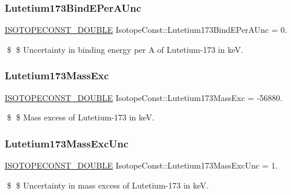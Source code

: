 \subsubsection{\texorpdfstring{Lutetium173\+Bind\+E\+Per\+A\+Unc}{Lutetium173BindEPerAUnc}}
{\footnotesize\ttfamily \mbox{\hyperlink{group___isotope_const-_macros_ga8f45a7272ce02c0b4c65c44636ed719a}{I\+S\+O\+T\+O\+P\+E\+C\+O\+N\+S\+T\+\_\+\+D\+O\+U\+B\+LE}} Isotope\+Const\+::\+Lutetium173\+Bind\+E\+Per\+A\+Unc = 0.}

\$ \$ Uncertainty in binding energy per A of Lutetium-\/173 in keV. \mbox{\label{group___isotope_const-_lutetium-_lu173_gabefba8f9fea2bd24eef29281dcc4f037}} 
\subsubsection{\texorpdfstring{Lutetium173\+Mass\+Exc}{Lutetium173MassExc}}
{\footnotesize\ttfamily \mbox{\hyperlink{group___isotope_const-_macros_ga8f45a7272ce02c0b4c65c44636ed719a}{I\+S\+O\+T\+O\+P\+E\+C\+O\+N\+S\+T\+\_\+\+D\+O\+U\+B\+LE}} Isotope\+Const\+::\+Lutetium173\+Mass\+Exc = -\/56880.}

\$ \$ Mass excess of Lutetium-\/173 in keV. \mbox{\label{group___isotope_const-_lutetium-_lu173_ga9b2df69228ace8dc5b831dd0d04b44ef}} 
\subsubsection{\texorpdfstring{Lutetium173\+Mass\+Exc\+Unc}{Lutetium173MassExcUnc}}
{\footnotesize\ttfamily \mbox{\hyperlink{group___isotope_const-_macros_ga8f45a7272ce02c0b4c65c44636ed719a}{I\+S\+O\+T\+O\+P\+E\+C\+O\+N\+S\+T\+\_\+\+D\+O\+U\+B\+LE}} Isotope\+Const\+::\+Lutetium173\+Mass\+Exc\+Unc = 1.}

\$ \$ Uncertainty in mass excess of Lutetium-\/173 in keV. \mbox{\label{group___isotope_const-_lutetium-_lu173_gac9e7f09ba8bc3f11db549970591cc0fe}} 
